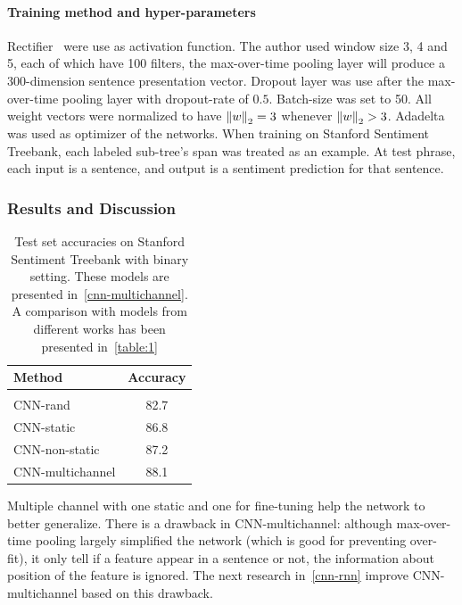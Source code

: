 \paragraph{Training method and hyper-parameters} 
Rectifier~\cite{rectifier} were use as activation function.
The author used window size 3, 4 and 5, each of which have 100 filters, the max-over-time pooling layer will produce a 300-dimension sentence presentation vector. 
Dropout layer was use after the max-over-time pooling layer with dropout-rate of \(0.5\).  
Batch-size was set to 50. 
All weight vectors were normalized to have \(\left\lVert w \right\rVert_2 = 3\) whenever \(\left\lVert w \right\rVert_2 > 3\). 
Adadelta~\cite{adadelta} was used as optimizer of the networks.
When training on Stanford Sentiment Treebank, each labeled sub-tree's span was treated as an example.
At test phrase, each input is a sentence, and output is a sentiment prediction for that sentence.

\subsubsection{Results and Discussion}\label{kimcnn-drawback}
\begin{table}[H]
\centering
\begin{tabular}{l c} 
 \hline
 \hline 
 Method & Accuracy \\ [0.5ex] 
 \hline
 \hline
 \\  
 CNN-rand & 82.7 \\ 
 CNN-static & 86.8 \\ 
 CNN-non-static & 87.2 \\ 
 CNN-multichannel & 88.1 \\ 
 \hline
 \hline
\end{tabular}
\caption{Test set accuracies on Stanford Sentiment Treebank with binary setting. These models are presented in~\ref{cnn-multichannel}.
A comparison with models from different works has been presented in~\ref{table:1}}
\label{table:KimCNN}
\end{table}

Multiple channel with one static and one for fine-tuning help the network to better generalize.
There is a drawback in CNN-multichannel: although max-over-time pooling largely simplified the network (which is good for preventing over-fit), it only tell if a feature appear in a sentence or not, the information about position of the feature is ignored.\label{kim-drawback}
The next research in~\ref{cnn-rnn}  improve CNN-multichannel based on this drawback.
 

